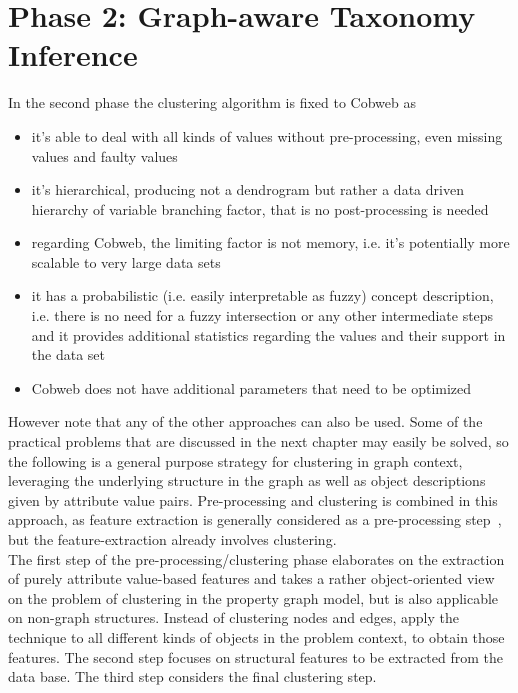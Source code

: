 \section{Phase 2: Graph-aware Taxonomy Inference}\label{\positionnumber}
In the second phase the clustering algorithm is fixed to Cobweb as 
\begin{itemize}
    \item it's able to deal with all kinds of values without pre-processing, even missing values and faulty values
    \item it's hierarchical, producing not a dendrogram but rather a data driven hierarchy of variable branching factor, that is no post-processing is needed
    \item regarding Cobweb, the limiting factor is not memory, i.e. it's potentially more scalable to very large data sets
    \item it has a probabilistic (i.e. easily interpretable as fuzzy) concept description, i.e. there is no need for a fuzzy intersection or any other intermediate steps and it provides additional statistics regarding the values and their support in the data set
    \item Cobweb does not have additional parameters that need to be optimized
\end{itemize}
However note that any of the other approaches can also be used. Some of the practical problems that are discussed in the next chapter may easily be solved, so the following is a general purpose strategy for clustering in graph context, leveraging the underlying structure in the graph as well as object descriptions given by attribute value pairs.
Pre-processing and clustering is combined in this approach, as feature extraction is generally considered as a pre-processing step~\cite{han2011data}, but the feature-extraction already involves clustering. \\
The first step of the pre-processing/clustering phase  elaborates on the extraction of purely attribute value-based features and takes a rather object-oriented view on the problem of clustering in the property graph model, but is also applicable on non-graph structures. Instead of clustering nodes and edges, apply the technique to all different kinds of objects in the problem context, to obtain those features. 
The second step focuses on structural features to be extracted from the data base. The third step considers the final clustering step.



